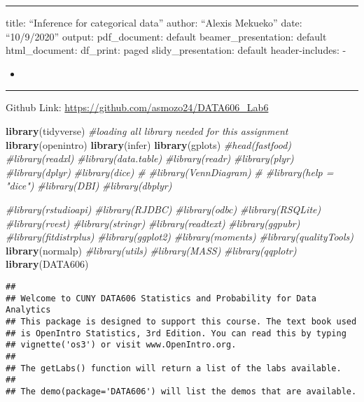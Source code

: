 \documentclass[
]{article}
\author{}
\date{\vspace{-2.5em}}
\newenvironment{Shaded}{\begin{snugshade}}{\end{snugshade}}
\newcommand{\CommentTok}[1]{\textcolor[rgb]{0.56,0.35,0.01}{\textit{#1}}}
\newcommand{\KeywordTok}[1]{\textcolor[rgb]{0.13,0.29,0.53}{\textbf{#1}}}
\newcommand{\NormalTok}[1]{#1}
\begin{document}
\begin{center}\rule{0.5\linewidth}{0.5pt}\end{center}

title: ``Inference for categorical data'' author: ``Alexis Mekueko''
date: ``10/9/2020'' output: pdf\_document: default beamer\_presentation:
default html\_document: df\_print: paged slidy\_presentation: default
header-includes: -

\usepackage{tikz}

\begin{itemize}
\item
  \usetikzlibrary{positioning,shapes.multipart,shapes}
\end{itemize}

\begin{center}\rule{0.5\linewidth}{0.5pt}\end{center}

Github Link: \url{https://github.com/asmozo24/DATA606_Lab6}

\begin{Shaded}
\begin{Highlighting}[]
\KeywordTok{library}\NormalTok{(tidyverse) }\CommentTok{#loading all library needed for this assignment}
\KeywordTok{library}\NormalTok{(openintro)}
\KeywordTok{library}\NormalTok{(infer)}
\KeywordTok{library}\NormalTok{(gplots)}
\CommentTok{#head(fastfood)}
\CommentTok{#library(readxl)}
\CommentTok{#library(data.table)}
\CommentTok{#library(readr)}
\CommentTok{#library(plyr)}
\CommentTok{#library(dplyr)}
\CommentTok{#library(dice)}
\CommentTok{# #library(VennDiagram)}
\CommentTok{# #library(help = "dice")}
\CommentTok{#library(DBI)}
\CommentTok{#library(dbplyr)}

\CommentTok{#library(rstudioapi)}
\CommentTok{#library(RJDBC)}
\CommentTok{#library(odbc)}
\CommentTok{#library(RSQLite)}
\CommentTok{#library(rvest)}
\CommentTok{#library(stringr)}
\CommentTok{#library(readtext)}
\CommentTok{#library(ggpubr)}
\CommentTok{#library(fitdistrplus)}
\CommentTok{#library(ggplot2)}
\CommentTok{#library(moments)}
\CommentTok{#library(qualityTools)}
\KeywordTok{library}\NormalTok{(normalp)}
\CommentTok{#library(utils)}
\CommentTok{#library(MASS)}
\CommentTok{#library(qqplotr)}
\KeywordTok{library}\NormalTok{(DATA606)}
\end{Highlighting}
\end{Shaded}

\begin{verbatim}
## 
## Welcome to CUNY DATA606 Statistics and Probability for Data Analytics 
## This package is designed to support this course. The text book used 
## is OpenIntro Statistics, 3rd Edition. You can read this by typing 
## vignette('os3') or visit www.OpenIntro.org. 
##  
## The getLabs() function will return a list of the labs available. 
##  
## The demo(package='DATA606') will list the demos that are available.
\end{verbatim}
\end{document}
